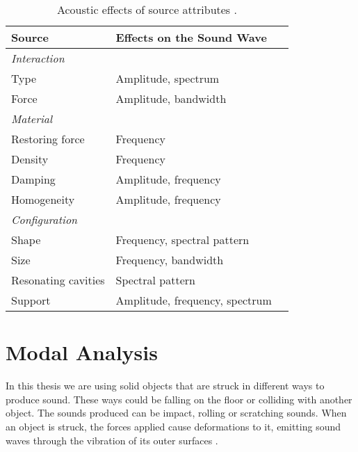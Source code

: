 \begin{table}[H]
	\centering
    \begin{tabular}{ | l | l | p{5cm} |}
    \hline
    \textbf{Source} & \textbf{Effects on the Sound Wave} \\ \hline
    \emph{Interaction} &  \\ 
    \hspace{8pt} Type & Amplitude, spectrum \\ 
    \hspace{8pt} Force & Amplitude, bandwidth \\
    \hline
    \emph{Material} &  \\ 
    \hspace{8pt} Restoring force & Frequency \\ 
    \hspace{8pt} Density & Frequency \\
    \hspace{8pt} Damping & Amplitude, frequency \\
    \hspace{8pt} Homogeneity & Amplitude, frequency \\
    \hline
    \emph{Configuration} &  \\ 
    \hspace{8pt} Shape & Frequency, spectral pattern \\ 
    \hspace{8pt} Size & Frequency, bandwidth \\
    \hspace{8pt} Resonating cavities & Spectral pattern \\
    \hspace{8pt} Support & Amplitude, frequency, spectrum \\
    \hline
    \end{tabular}
    \caption{Acoustic effects of source attributes \cite{gaver1993world}.}
    \label{tab:acoustic_effects}
\end{table}



\section{Modal Analysis}\label{sec:modal_analysis}
In this thesis we are using solid objects that are struck in different ways to produce sound. These ways could be falling on the floor or colliding with another object. The sounds produced can be impact, rolling or scratching sounds. When an object is struck, the forces applied cause deformations to it, emitting sound waves through the vibration of its outer surfaces \cite{van2001foleyautomatic}.

